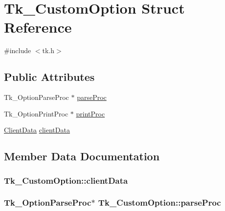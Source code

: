 \hypertarget{struct_tk___custom_option}{}\section{Tk\+\_\+\+Custom\+Option Struct Reference}
\label{struct_tk___custom_option}


{\ttfamily \#include $<$tk.\+h$>$}

\subsection*{Public Attributes}
\begin{DoxyCompactItemize}
\item 
Tk\+\_\+\+Option\+Parse\+Proc $\ast$ \hyperlink{struct_tk___custom_option_a9aaaa3ae7603113a4b0f9b2f11bc92ca}{parse\+Proc}
\item 
Tk\+\_\+\+Option\+Print\+Proc $\ast$ \hyperlink{struct_tk___custom_option_a733c30edacbbec75301f524627af86ac}{print\+Proc}
\item 
\hyperlink{tk_8h_accf84b4d725a8f41e04d6333768a6001}{Client\+Data} \hyperlink{struct_tk___custom_option_a23bebc59cc0313fee78020261e16b6e4}{client\+Data}
\end{DoxyCompactItemize}


\subsection{Member Data Documentation}
\subsubsection[{\texorpdfstring{client\+Data}{clientData}}]{ Tk\+\_\+\+Custom\+Option\+::client\+Data}\hypertarget{struct_tk___custom_option_a23bebc59cc0313fee78020261e16b6e4}{}\label{struct_tk___custom_option_a23bebc59cc0313fee78020261e16b6e4}
\subsubsection[{\texorpdfstring{parse\+Proc}{parseProc}}]{\setlength{\rightskip}{0pt plus 5cm}Tk\+\_\+\+Option\+Parse\+Proc$\ast$ Tk\+\_\+\+Custom\+Option\+::parse\+Proc}\hypertarget{struct_tk___custom_option_a9aaaa3ae7603113a4b0f9b2f11bc92ca}{}\label{struct_tk___custom_option_a9aaaa3ae7603113a4b0f9b2f11bc92ca}
